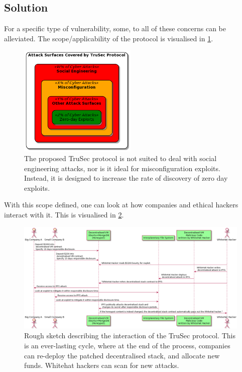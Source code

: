 \subsection{Solution}
For a specific type of vulnerability, some, to all of these concerns can be alleviated. The scope/applicability of the protocol is visualised in \cref{fig:protocol_scope}.
\begin{figure}[H]
    \centering
    \includegraphics[width=0.50\textwidth]{images/plantuml/scope.png}
    \caption{The proposed TruSec protocol is not suited to deal with social engineering attacks, nor is it ideal for misconfiguration exploits. Instead, it is designed to increase the rate of discovery of zero day exploits.}
    \label{fig:protocol_scope}
\end{figure}
With this scope defined, one can look at how companies and ethical hackers interact with it. This is visualised in \cref{fig:interaction}.

\begin{figure}[H]
    \centering
    \includegraphics[width=1.0\textwidth]{images/plantuml/interaction.png}
    \caption{Rough sketch describing the interaction of the TruSec protocol. This is an ever-lasting cycle, where at the end of the process, companies can re-deploy the patched decentralised stack, and allocate new funds. Whitehat hackers can scan for new attacks.}
    \label{fig:interaction}
\end{figure}

